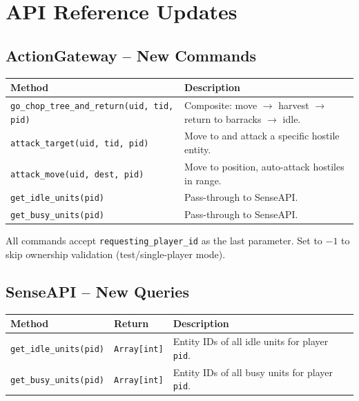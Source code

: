 \documentclass[11pt,a4paper]{article}
\begin{document}
\section{API Reference Updates}

\subsection{ActionGateway -- New Commands}

\begin{center}
\begin{tabular}{|l|p{8cm}|}
\hline
\textbf{Method} & \textbf{Description} \\
\hline
\texttt{go\_chop\_tree\_and\_return(uid, tid, pid)} & Composite: move $\rightarrow$ harvest $\rightarrow$ return to barracks $\rightarrow$ idle. \\
\texttt{attack\_target(uid, tid, pid)} & Move to and attack a specific hostile entity. \\
\texttt{attack\_move(uid, dest, pid)} & Move to position, auto-attack hostiles in range. \\
\texttt{get\_idle\_units(pid)} & Pass-through to SenseAPI. \\
\texttt{get\_busy\_units(pid)} & Pass-through to SenseAPI. \\
\hline
\end{tabular}
\end{center}

All commands accept \texttt{requesting\_player\_id} as the last parameter.
Set to $-1$ to skip ownership validation (test/single-player mode).

\subsection{SenseAPI -- New Queries}

\begin{center}
\begin{tabular}{|l|l|p{6cm}|}
\hline
\textbf{Method} & \textbf{Return} & \textbf{Description} \\
\hline
\texttt{get\_idle\_units(pid)} & \texttt{Array[int]} & Entity IDs of all idle units for player \texttt{pid}. \\
\texttt{get\_busy\_units(pid)} & \texttt{Array[int]} & Entity IDs of all busy units for player \texttt{pid}. \\
\hline
\end{tabular}
\end{center}
\end{document}
